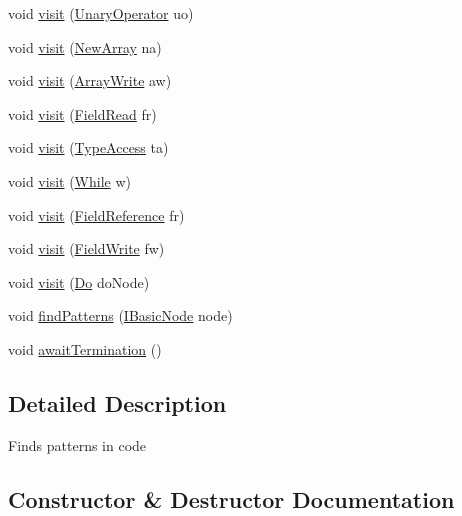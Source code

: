 \begin{DoxyCompactItemize}
$$\item 
void \hyperlink{classmain_1_1_find_pattern_ac1947f846a05ed5f0e350f85440e500a}{visit} (\hyperlink{classparser_1_1_unary_operator}{Unary\+Operator} uo)
\item 
void \hyperlink{classmain_1_1_find_pattern_aaedf8faf24d3f5768201345ac48faec4}{visit} (\hyperlink{classparser_1_1_new_array}{New\+Array} na)
\item 
void \hyperlink{classmain_1_1_find_pattern_a544f9712011aace5009a5968dedfe70d}{visit} (\hyperlink{classparser_1_1_array_write}{Array\+Write} aw)
\item 
void \hyperlink{classmain_1_1_find_pattern_afdb1f22b4ebb01aff3ceac4faf50bc72}{visit} (\hyperlink{classparser_1_1_field_read}{Field\+Read} fr)
\item 
void \hyperlink{classmain_1_1_find_pattern_ab4ff8507ce6dfd72d4aa2fb3292c2300}{visit} (\hyperlink{classparser_1_1_type_access}{Type\+Access} ta)
\item 
void \hyperlink{classmain_1_1_find_pattern_aaae3db86cb736b5938082a889cbe8f07}{visit} (\hyperlink{classparser_1_1_while}{While} w)
\item 
void \hyperlink{classmain_1_1_find_pattern_a3bb209a67dfe2002b50a6e34f433b33b}{visit} (\hyperlink{classparser_1_1_field_reference}{Field\+Reference} fr)
\item 
void \hyperlink{classmain_1_1_find_pattern_a727f5e90e283cd7350705bb4a93ab345}{visit} (\hyperlink{classparser_1_1_field_write}{Field\+Write} fw)
\item 
void \hyperlink{classmain_1_1_find_pattern_a9ca926cdbffea32b67a5e73d45ecd428}{visit} (\hyperlink{classparser_1_1_do}{Do} do\+Node)
\item 
void \hyperlink{classmain_1_1_find_pattern_a6b097445ba17c69dac08c9015546e420}{find\+Patterns} (\hyperlink{interfaceparser_1_1_i_basic_node}{I\+Basic\+Node} node)
\item 
void \hyperlink{classmain_1_1_find_pattern_af7eb90877212efef585502628abf5038}{await\+Termination} ()
\end{DoxyCompactItemize}


\subsection{Detailed Description}
Finds patterns in code 

\subsection{Constructor \& Destructor Documentation}
